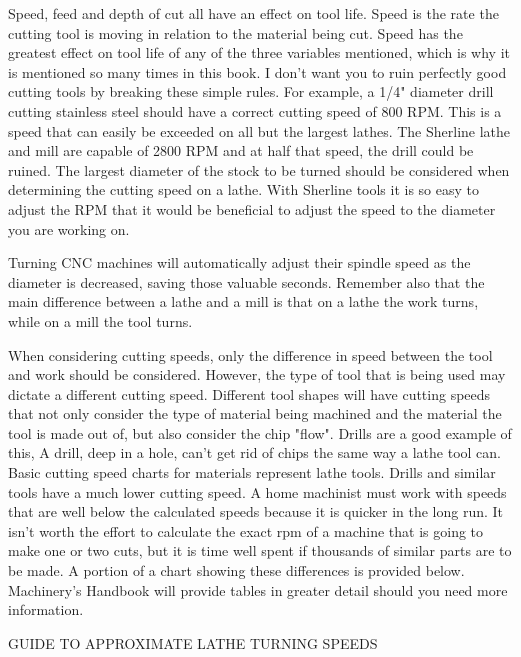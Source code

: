 
Speed, feed and depth of cut all have an effect on tool life. Speed is the rate
the cutting tool is moving in relation to the material being cut. Speed has the
greatest effect on tool life of any of the three variables mentioned, which is
why it is mentioned so many times in this book. I don't want you to ruin
perfectly good cutting tools by breaking these simple rules. For example, a 1/4"
diameter drill cutting stainless steel should have a correct cutting speed of
800 RPM. This is a speed that can easily be exceeded on all but the largest
lathes. The Sherline lathe and mill are capable of 2800 RPM and at half that
speed, the drill could be ruined. The largest diameter of the stock to be turned
should be considered when determining the cutting speed on a lathe. With
Sherline tools it is so easy to adjust the RPM that it would be beneficial to
adjust the speed to the diameter you are working on.

Turning CNC machines will automatically adjust their spindle speed as the
diameter is decreased, saving those valuable seconds. Remember also that the
main difference between a lathe and a mill is that on a lathe the work turns,
while on a mill the tool turns.


When considering cutting speeds, only the difference in speed between the tool
and work should be considered. However, the type of tool that is being used may
dictate a different cutting speed. Different tool shapes will have cutting
speeds that not only consider the type of material being machined and the
material the tool is made out of, but also consider the chip "flow". Drills are
a good example of this, A drill, deep in a hole, can't get rid of chips the same
way a lathe tool can. Basic cutting speed charts for materials represent lathe
tools. Drills and similar tools have a much lower cutting speed. A home
machinist must work with speeds that are well below the calculated speeds
because it is quicker in the long run. It isn't worth the effort to calculate
the exact rpm of a machine that is going to make one or two cuts, but it is time
well spent if thousands of similar parts are to be made. A portion of a chart
showing these differences is provided below. Machinery's Handbook will provide
tables in greater detail should you need more information.

\clearpage
\bigskip
GUIDE TO APPROXIMATE LATHE TURNING SPEEDS

